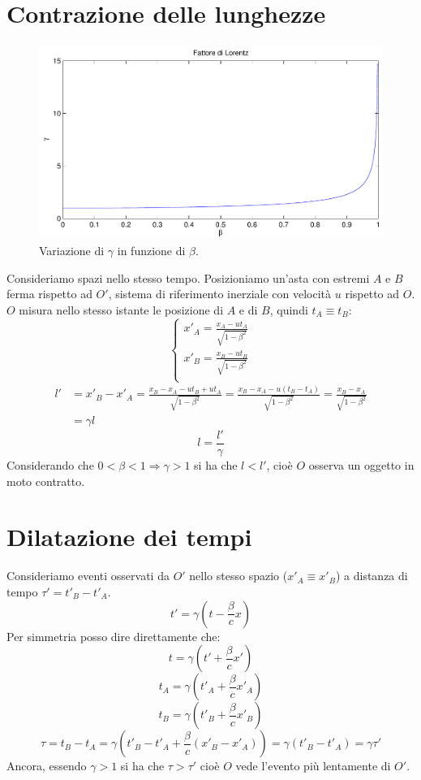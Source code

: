 \section{Contrazione delle lunghezze}
\begin{figure}[htbp]
   \centering
   \includegraphics[scale=0.5]{immagini/fisica1/beta_gamma}
   \caption{Variazione di $\gamma$ in funzione di $\beta$.}
\end{figure}
Consideriamo spazi nello stesso tempo. Posizioniamo un'asta con estremi $A$ e $B$ ferma rispetto ad $O'$, sistema di riferimento inerziale con velocità $u$ rispetto ad $O$.
$O$ misura nello stesso istante le posizione di $A$ e di $B$, quindi $t_A\equiv t_B$:
\[\left\{
   \begin{array}{l}
      x'_A=\frac{x_A-ut_A}{\sqrt{1-\beta^2}} \\
      x'_B=\frac{x_B-ut_B}{\sqrt{1-\beta^2}} \\
   \end{array}
   \right.\]
\begin{align*}
   l' & =x'_B-x'_A=\frac{x_B-x_A-ut_B+ut_A}{\sqrt{1-\beta^2}}=\frac{x_B-x_A-u(t_B-t_A)}{\sqrt{1-\beta^2}}=\frac{x_B-x_A}{\sqrt{1-\beta^2}} \\
      & =\gamma l
\end{align*}
\begin{equation}
   l=\frac{l'}{\gamma}
\end{equation}
Considerando che $0<\beta<1\Rightarrow\gamma>1$ si ha che $l<l'$, cioè $O$ osserva un oggetto in moto contratto.

\section{Dilatazione dei tempi}
Consideriamo eventi osservati da $O'$ nello stesso spazio ($x'_A\equiv x'_B$) a distanza di tempo $\tau'=t'_B-t'_A$.
\[t'=\gamma\left(t-\frac{\beta}{c}x\right)\]
Per simmetria posso dire direttamente che:
\[t=\gamma\left(t'+\frac{\beta}{c}x'\right)\]
\[t_A=\gamma\left(t'_A+\frac{\beta}{c}x'_A\right)\]
\[t_B=\gamma\left(t'_B+\frac{\beta}{c}x'_B\right)\]
\begin{equation}
   \tau=t_B-t_A=\gamma\left(t'_B-t'_A+\frac{\beta}{c}\left(x'_B-x'_A\right)\right)=\gamma\left(t'_B-t'_A\right)=\gamma\tau'
\end{equation}
Ancora, essendo $\gamma>1$ si ha che $\tau>\tau'$ cioè $O$ vede l'evento più lentamente di $O'$.

